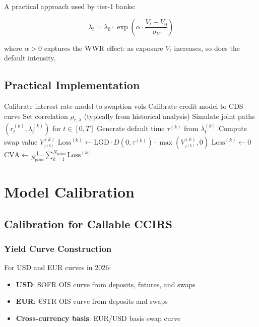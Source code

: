 \documentclass[conference]{IEEEtran}
\theoremstyle{definition}
\newcommand{\LGD}{\mathrm{LGD}}
\newcommand{\CVA}{\mathrm{CVA}}
\begin{document}
A practical approach used by tier-1 banks:

\begin{equation}
\lambda_t = \lambda_0 \cdot \exp\left(\alpha \cdot \frac{V_t - V_0}{\sigma_V}\right)
\end{equation}

where $\alpha > 0$ captures the WWR effect: as exposure $V_t$ increases, so does the default intensity.

\subsection{Practical Implementation}

\begin{algorithm}
\caption{Monte Carlo CVA with Wrong-Way Risk}
\begin{algorithmic}[1]
\State Calibrate interest rate model to swaption vols
\State Calibrate credit model to CDS curve
\State Set correlation $\rho_{r,\lambda}$ (typically from historical analysis)
    \State Simulate joint paths $(r_t^{(k)}, \lambda_t^{(k)})$ for $t \in [0,T]$
    \State Generate default time $\tau^{(k)}$ from $\lambda_t^{(k)}$
        \State Compute swap value $V_{\tau^{(k)}}^{(k)}$
        \State $\text{Loss}^{(k)} \gets \LGD \cdot D(0,\tau^{(k)}) \cdot \max(V_{\tau^{(k)}}^{(k)}, 0)$
    \Else
        \State $\text{Loss}^{(k)} \gets 0$
    \EndIf
\EndFor
\State \Return $\CVA \gets \frac{1}{N_{\text{paths}}} \sum_{k=1}^{N_{\text{paths}}} \text{Loss}^{(k)}$
\end{algorithmic}
\end{algorithm}

\section{Model Calibration}

\subsection{Calibration for Callable CCIRS}

\subsubsection{Yield Curve Construction}

For USD and EUR curves in 2026:
\begin{itemize}
    \item \textbf{USD}: SOFR OIS curve from deposits, futures, and swaps
    \item \textbf{EUR}: €STR OIS curve from deposits and swaps
    \item \textbf{Cross-currency basis}: EUR/USD basis swap curve
\end{itemize}
\end{document}
